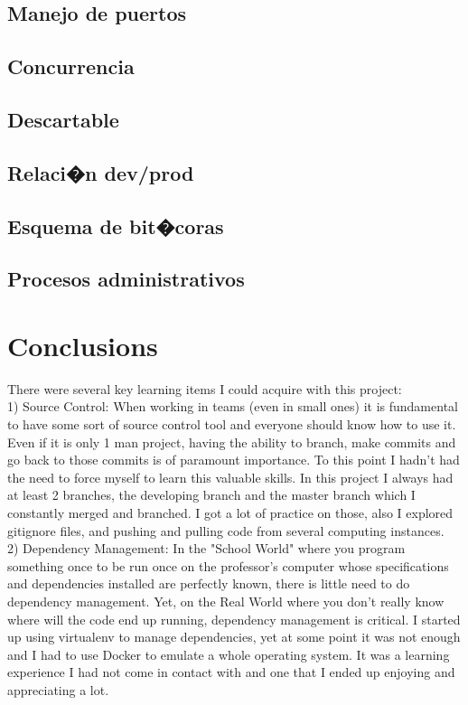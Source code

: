 \documentclass[10pt]{article}
\begin{document}
 \subsection{Manejo de puertos}
 \subsection{Concurrencia}
 \subsection{Descartable}
 \subsection{Relaci�n dev/prod}
 \subsection{Esquema de bit�coras}
 \subsection{Procesos administrativos}
\section{Conclusions}
There were several key learning items I could acquire with this project:\\

1) Source Control: When working in teams (even in small ones) it is fundamental to have some sort of source control tool and everyone should know how to use it. Even if it is only 1 man project, having the ability to branch, make commits and go back to those commits is of paramount importance. To this point I hadn't had the need to force myself to learn this valuable skills. In this project I always had at least 2 branches, the developing branch and the master branch which I constantly merged and branched. I got a lot of practice on those, also I explored gitignore files, and pushing and pulling code from several computing instances.\\

2) Dependency Management: In the "School World" where you program something once to be run once on the professor's computer whose specifications and dependencies installed are perfectly known, there is little need to do dependency management. Yet, on the Real World where you don't really know where will the code end up running, dependency management is critical. I started up using virtualenv to manage dependencies, yet at some point it was not enough and I had to use Docker to emulate a whole operating system. It was a learning experience I had not come in contact with and one that I ended up enjoying and appreciating a lot.\\
\end{document}
